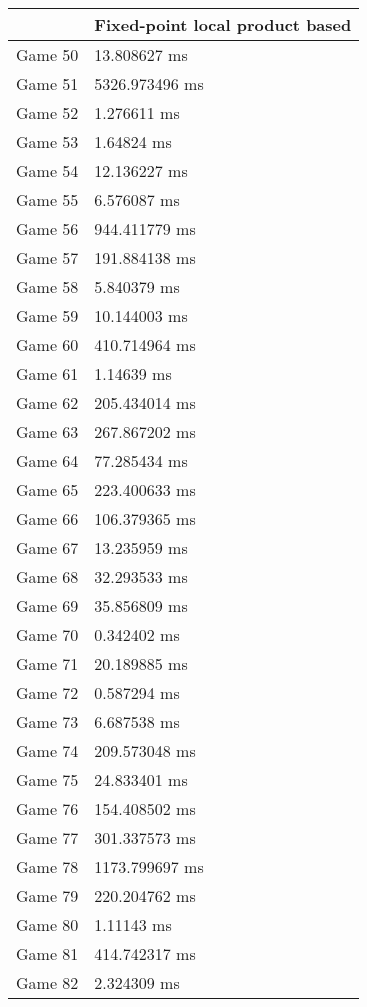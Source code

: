 \begin{tabular}{|l|l|}
	\hline
	& Fixed-point local product based \\ \hline
	Game 50 & 13.808627 ms \\ \hline
	Game 51 & 5326.973496 ms \\ \hline
	Game 52 & 1.276611 ms \\ \hline
	Game 53 & 1.64824 ms \\ \hline
	Game 54 & 12.136227 ms \\ \hline
	Game 55 & 6.576087 ms \\ \hline
	Game 56 & 944.411779 ms \\ \hline
	Game 57 & 191.884138 ms \\ \hline
	Game 58 & 5.840379 ms \\ \hline
	Game 59 & 10.144003 ms \\ \hline
	Game 60 & 410.714964 ms \\ \hline
	Game 61 & 1.14639 ms \\ \hline
	Game 62 & 205.434014 ms \\ \hline
	Game 63 & 267.867202 ms \\ \hline
	Game 64 & 77.285434 ms \\ \hline
	Game 65 & 223.400633 ms \\ \hline
	Game 66 & 106.379365 ms \\ \hline
	Game 67 & 13.235959 ms \\ \hline
	Game 68 & 32.293533 ms \\ \hline
	Game 69 & 35.856809 ms \\ \hline
	Game 70 & 0.342402 ms \\ \hline
	Game 71 & 20.189885 ms \\ \hline
	Game 72 & 0.587294 ms \\ \hline
	Game 73 & 6.687538 ms \\ \hline
	Game 74 & 209.573048 ms \\ \hline
	Game 75 & 24.833401 ms \\ \hline
	Game 76 & 154.408502 ms \\ \hline
	Game 77 & 301.337573 ms \\ \hline
	Game 78 & 1173.799697 ms \\ \hline
	Game 79 & 220.204762 ms \\ \hline
	Game 80 & 1.11143 ms \\ \hline
	Game 81 & 414.742317 ms \\ \hline
	Game 82 & 2.324309 ms \\ \hline

\end{tabular}
